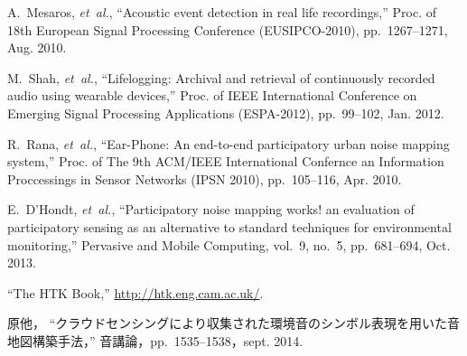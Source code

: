 \documentclass[autodetect-engine,dvi=dvipdfmx,ja=standard,
               a4,twoside,10pt]{bxjsarticle}
\begin{document}
\begin{thebibliography}{9}
 \setlength\itemsep{4pt}    %
 \setlength\baselineskip{11.5pt} %

  A.~Mesaros, \textit{et~al.},
  ``Acoustic event detection in real life recordings,''
  Proc. of 18th European Signal Processing Conference (EUSIPCO-2010), pp.~1267--1271, Aug. 2010.

  M.~Shah, \textit{et~al.},
  ``Lifelogging: Archival and retrieval of continuously recorded audio using wearable devices,''
  Proc. of IEEE International Conference on Emerging Signal Processing Applications (ESPA-2012), pp.~99--102, Jan. 2012.

  R.~Rana, \textit{et~al.},
  ``{Ear}-{Phone}: An end-to-end participatory urban noise mapping system,''
  Proc. of The 9th ACM/IEEE International Confernce an Information Proccessings in Sensor Networks (IPSN 2010), pp.~105--116, Apr. 2010.

  E.~D'Hondt, \textit{et~al.},
  ``Participatory noise mapping works! an evaluation of participatory sensing as an alternative to standard techniques for environmental monitoring,''
  Pervasive and Mobile Computing, vol.~9, no.~5, pp.~681--694, Oct. 2013.

  ``The {HTK} {Book},'' \url{http://htk.eng.cam.ac.uk/}.

  原他，
  ``クラウドセンシングにより収集された環境音のシンボル表現を用いた音地図構築手法，\inhibitglue''
  音講論，pp.~1535--1538，sept. 2014.

\end{thebibliography}
\end{document}

